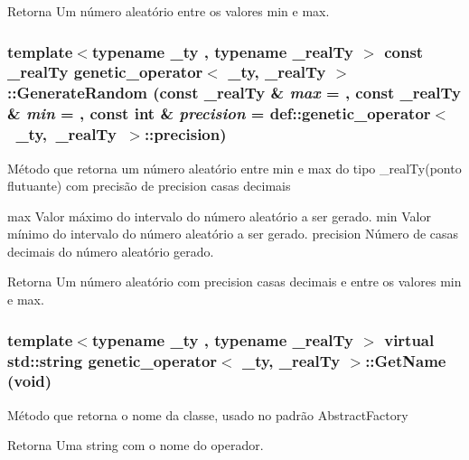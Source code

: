 \begin{DoxyReturn}{Retorna}
Um número aleatório entre os valores min e max. 
\end{DoxyReturn}
\hypertarget{classgenetic__operator_a406eeb5144dd74698fcd9a120f021aba}{
\subsubsection[{GenerateRandom}]{\setlength{\rightskip}{0pt plus 5cm}template$<$typename \_\-ty , typename \_\-realTy $>$ const \_\-realTy {\bf genetic\_\-operator}$<$ \_\-ty, \_\-realTy $>$::GenerateRandom (const \_\-realTy \& {\em max} = {}, \/  const \_\-realTy \& {\em min} = {}, \/  const int \& {\em precision} = {\ttfamily def::genetic\_\-operator$<$~\_\-ty,~\_\-realTy~$>$::precision})}}
\label{classgenetic__operator_a406eeb5144dd74698fcd9a120f021aba}
Método que retorna um número aleatório entre min e max do tipo \_\-realTy(ponto flutuante) com precisão de precision casas decimais

max Valor máximo do intervalo do número aleatório a ser gerado.  min Valor mínimo do intervalo do número aleatório a ser gerado.  precision Número de casas decimais do número aleatório gerado.

\begin{DoxyReturn}{Retorna}
Um número aleatório com precision casas decimais e entre os valores min e max. 
\end{DoxyReturn}
\hypertarget{classgenetic__operator_ae0f79368c0b4ad0cff3f608727bd87f5}{
\subsubsection[{GetName}]{\setlength{\rightskip}{0pt plus 5cm}template$<$typename \_\-ty , typename \_\-realTy $>$ virtual std::string {\bf genetic\_\-operator}$<$ \_\-ty, \_\-realTy $>$::GetName (void)}}
\label{classgenetic__operator_ae0f79368c0b4ad0cff3f608727bd87f5}
Método que retorna o nome da classe, usado no padrão AbstractFactory

\begin{DoxyReturn}{Retorna}
Uma string com o nome do operador. 
\end{DoxyReturn}



